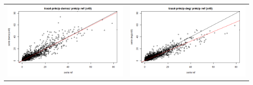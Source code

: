 \documentclass[a4paper,10pt]{article}
\begin{document}
\hspace{-1cm}
\begin{tabular}{cc}
	\includegraphics[scale=0.4]{images/pr_3_ds.png} & \includegraphics[scale=0.4]{images/pr_3_dg.png}   \\

\end{tabular}
\end{document}
